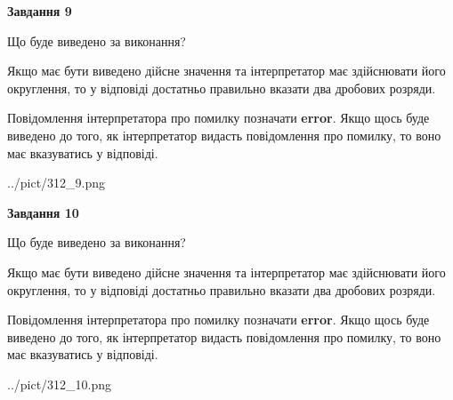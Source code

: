 \documentclass[12pt, ukrainian]{article}
\begin{document}
{\begin {Large}
{\begin {center}\textbf{Завдання 9}\end {center}}\par
Що буде виведено за виконання? \par

Якщо має бути виведено дійсне значення та інтерпретатор має здійснювати його округлення, 
то у відповіді достатньо правильно вказати два дробових розряди.

Повідомлення інтерпретатора про помилку позначати \textbf{error}.
Якщо щось буде виведено до того, як інтерпретатор видасть повідомлення про помилку, 
то воно має вказуватись у відповіді. \par

\begin{center}
	{../pict/312_9.png}
\end{center}
\newpage

{\begin {center}\textbf{Завдання 10}\end {center}}\par
Що буде виведено за виконання? \par

Якщо має бути виведено дійсне значення та інтерпретатор має здійснювати його округлення, 
то у відповіді достатньо правильно вказати два дробових розряди.

Повідомлення інтерпретатора про помилку позначати \textbf{error}.
Якщо щось буде виведено до того, як інтерпретатор видасть повідомлення про помилку, 
то воно має вказуватись у відповіді. \par

\begin{center}
	{../pict/312_10.png}
\end{center}
\newpage

\end {Large}}
\end{document}
